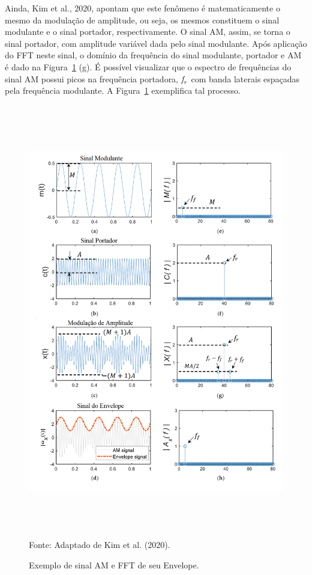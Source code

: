 \documentclass[
	12pt,				
	oneside,			
	a4paper,			
	english,			
	brazil,			
	]{abntex2ppgsi}
\newcommand{\f}{\mkern-2mu f\mkern-3mu}
\begin{document}
Ainda, Kim et al., 2020, apontam que este fenômeno é matematicamente o mesmo da modulação de amplitude, ou seja, os mesmos constituem o sinal modulante e o sinal portador, respectivamente. O sinal AM, assim, se torna o sinal portador, com amplitude variável dada pelo sinal modulante. Após aplicação do FFT neste sinal, o domínio da frequência do sinal modulante, portador e AM é dado na Figura~\ref{exemplo_AM_FFT} (g). É possível visualizar que o espectro de frequências do sinal AM possui picos na frequência portadora, ${\f}_r$ com banda laterais espaçadas pela frequência modulante. A Figura~\ref{exemplo_AM_FFT} exemplifica tal processo. 

\begin{figure}[!htb]
\centering
\caption {Exemplo de sinal AM e FFT de seu Envelope.}
\includegraphics[width=\textwidth,height=190mm,keepaspectratio]{exemplo_AM_FFT} \\
Fonte: Adaptado de Kim et al. (2020).
\label{exemplo_AM_FFT}
\end{figure}
\end{document}
